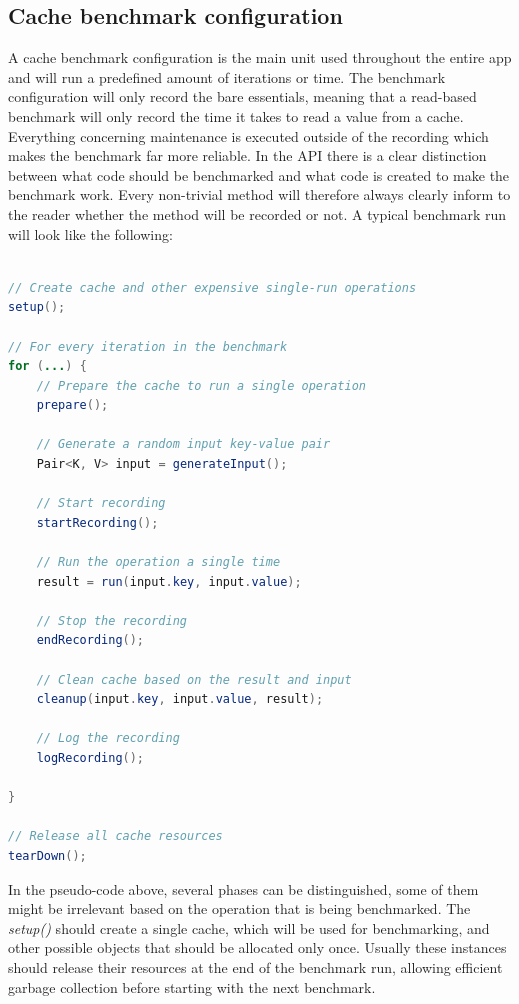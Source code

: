 \documentclass[pdftex,a4paper,12pt,twoside]{report}
\begin{document}
\subsection{Cache benchmark configuration}
A cache benchmark configuration is the main unit used throughout the entire app and will run a predefined amount of iterations or time. The benchmark configuration will only record the bare essentials, meaning that a read-based benchmark will only record the time it takes to read a value from a cache. Everything concerning maintenance is executed outside of the recording which makes the benchmark far more reliable. In the API there is a clear distinction between what code should be benchmarked and what code is created to make the benchmark work. Every non-trivial method will therefore always clearly inform to the reader whether the method will be recorded or not. A typical benchmark run will look like the following:
\\\\
\begin{lstlisting}[language=java]
// Create cache and other expensive single-run operations
setup();

// For every iteration in the benchmark
for (...) {
	// Prepare the cache to run a single operation
	prepare();
	
	// Generate a random input key-value pair
	Pair<K, V> input = generateInput();
	
	// Start recording
	startRecording();
	
	// Run the operation a single time
	result = run(input.key, input.value);
	
	// Stop the recording
	endRecording();
	
	// Clean cache based on the result and input
	cleanup(input.key, input.value, result);
	
	// Log the recording
	logRecording();
	
}

// Release all cache resources
tearDown();
\end{lstlisting}
In the pseudo-code above, several phases can be distinguished, some of them might be irrelevant based on the operation that is being benchmarked. The \emph{setup()} should create a single cache, which will be used for benchmarking, and other possible objects that should be allocated only once. Usually these instances should release their resources at the end of the benchmark run, allowing efficient garbage collection before starting with the next benchmark.
\\\\
\end{document}
